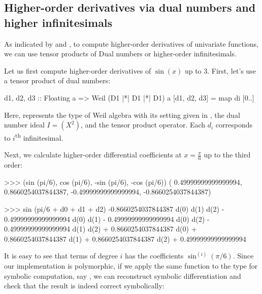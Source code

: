 \subsection{Higher-order derivatives via dual numbers and higher infinitesimals}
As indicated by  and ,
to compute higher-order derivatives of univariate functions, we can use tensor products of Dual numbers or higher-order infinitesimals.

Let us first compute higher-order derivatives of $\sin(x)$ up to $3$.
First, let's use a tensor product of dual numbers:
\begin{code}
d1, d2, d3 :: Floating a => Weil (D1 |*| D1 |*| D1) a
[d1, d2, d3] = map di [0..]
\end{code}
Here,  represents the type of Weil algebra with its setting given in ,  the dual number ideal $I = (X^2)$, and \hask{|*|} the tensor product operator.
Each $d_i$ corresponds to $i$\textsuperscript{th} infinitesimal.

Next, we calculate higher-order differential coefficients at $x = \frac{\pi}{6}$ up to the third order:

\begin{repl}
>>> (sin (pi/6),  cos (pi/6), -sin (pi/6), -cos (pi/6))
( 0.49999999999999994, 0.8660254037844387, -0.49999999999999994,
  -0.8660254037844387)

>>> sin (pi/6 + d0 + d1 + d2)
-0.8660254037844387 d(0) d(1) d(2) - 0.49999999999999994 d(0) d(1) 
  - 0.49999999999999994 d(0) d(2)  - 0.49999999999999994 d(1) d(2) 
  + 0.8660254037844387 d(0) + 0.8660254037844387 d(1) 
  + 0.8660254037844387 d(2) + 0.49999999999999994
\end{repl}

It is easy to see that terms of degree $i$ has the coefficients $\sin^{(i)}(\pi/6)$.
Since our implementation is polymorphic, if we apply the same function to the type for symbolic computation, say , we can reconstruct symbolic differentiation and check that the result is indeed correct symbolically:



